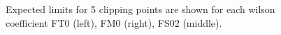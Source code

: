 \begin{figure}[ht]
    \centering
        \caption{Expected limits for 5 clipping points are shown for each wilson coefficient FT0 (left), FM0 (right), FS02 (middle).}
        \label{fig:aQGClimits}
\end{figure}


